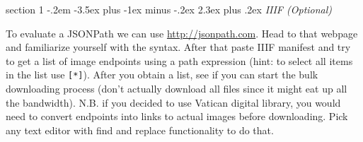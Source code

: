 \documentclass[12pt]{article}
\makeatletter
\newenvironment{problem}{\@startsection
	{section}
	{1}
	{-.2em}
	{-3.5ex plus -1ex minus -.2ex}
	{2.3ex plus .2ex}
	{\pagebreak[3]%
		\large\bf\noindent{Exercise }
	}
}
{\vspace{0.8cm}}
\makeatother
\begin{document}
\begin{problem}{\it IIIF (Optional)}
\begin{enumerate}[label=\textbf{\alph*)},leftmargin=*]
		To evaluate a JSONPath we can use \url{http://jsonpath.com}. Head to that webpage and familiarize yourself with the syntax. After that paste IIIF manifest and try to get a list of image endpoints using a path expression (hint: to select all items in the list use \texttt{[*]}). After you obtain a list, see if you can start the bulk downloading process (don't actually download all files since it might eat up all the bandwidth). N.B. if you decided to use Vatican digital library, you would need to convert endpoints into links to actual images before downloading. Pick any text editor with find and replace functionality to do that.
		
	\end{enumerate}

	
	
	
	
\end{problem}
	
\end{document}
